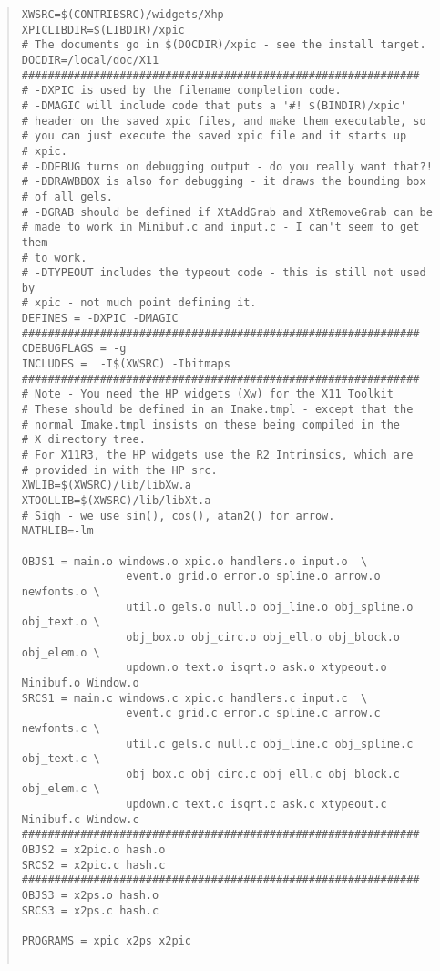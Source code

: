 \begin{quote}
\begin{verbatim}
XWSRC=$(CONTRIBSRC)/widgets/Xhp
XPICLIBDIR=$(LIBDIR)/xpic
# The documents go in $(DOCDIR)/xpic - see the install target. 
DOCDIR=/local/doc/X11
#############################################################
# -DXPIC is used by the filename completion code.
# -DMAGIC will include code that puts a '#! $(BINDIR)/xpic'
# header on the saved xpic files, and make them executable, so
# you can just execute the saved xpic file and it starts up
# xpic.
# -DDEBUG turns on debugging output - do you really want that?!
# -DDRAWBBOX is also for debugging - it draws the bounding box
# of all gels.
# -DGRAB should be defined if XtAddGrab and XtRemoveGrab can be 
# made to work in Minibuf.c and input.c - I can't seem to get them
# to work.
# -DTYPEOUT includes the typeout code - this is still not used by
# xpic - not much point defining it.
DEFINES = -DXPIC -DMAGIC
#############################################################
CDEBUGFLAGS = -g
INCLUDES =  -I$(XWSRC) -Ibitmaps
#############################################################
# Note - You need the HP widgets (Xw) for the X11 Toolkit
# These should be defined in an Imake.tmpl - except that the 
# normal Imake.tmpl insists on these being compiled in the 
# X directory tree.
# For X11R3, the HP widgets use the R2 Intrinsics, which are
# provided in with the HP src.
XWLIB=$(XWSRC)/lib/libXw.a
XTOOLLIB=$(XWSRC)/lib/libXt.a
# Sigh - we use sin(), cos(), atan2() for arrow. 
MATHLIB=-lm

OBJS1 = main.o windows.o xpic.o handlers.o input.o  \
                event.o grid.o error.o spline.o arrow.o newfonts.o \
                util.o gels.o null.o obj_line.o obj_spline.o obj_text.o \
                obj_box.o obj_circ.o obj_ell.o obj_block.o obj_elem.o \
                updown.o text.o isqrt.o ask.o xtypeout.o Minibuf.o Window.o
SRCS1 = main.c windows.c xpic.c handlers.c input.c  \
                event.c grid.c error.c spline.c arrow.c newfonts.c \
                util.c gels.c null.c obj_line.c obj_spline.c obj_text.c \
                obj_box.c obj_circ.c obj_ell.c obj_block.c obj_elem.c \
                updown.c text.c isqrt.c ask.c xtypeout.c Minibuf.c Window.c
#############################################################
OBJS2 = x2pic.o hash.o
SRCS2 = x2pic.c hash.c
#############################################################
OBJS3 = x2ps.o hash.o
SRCS3 = x2ps.c hash.c

PROGRAMS = xpic x2ps x2pic


\end{verbatim}
\end{quote}
